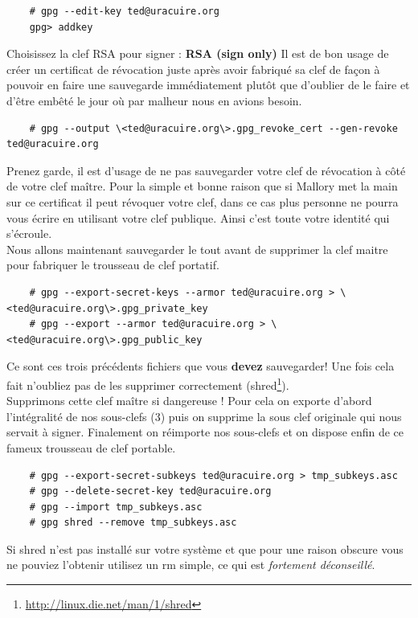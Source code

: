 \documentclass[a4paper]{article}
\begin{document}
\begin{verbatim}
    # gpg --edit-key ted@uracuire.org
    gpg> addkey
\end{verbatim}
Choisissez la clef RSA pour signer : \textbf{RSA (sign only)}
\newpage
Il est de bon usage de créer un certificat de révocation juste après avoir
fabriqué sa clef de façon à pouvoir en faire une sauvegarde immédiatement
plutôt que d'oublier de le faire et d'être embêté le jour où par malheur nous
en avions besoin.

\begin{verbatim}
    # gpg --output \<ted@uracuire.org\>.gpg_revoke_cert --gen-revoke ted@uracuire.org
\end{verbatim}
Prenez garde, il est d'usage de ne pas sauvegarder votre clef de révocation à
côté de votre clef maître. Pour la simple et bonne raison que si Mallory met la
main sur ce certificat il peut révoquer votre clef, dans ce cas plus personne
ne pourra vous écrire en utilisant votre clef publique. Ainsi c'est toute votre
identité qui s'écroule.
\\
Nous allons maintenant sauvegarder le tout avant de supprimer la clef maitre
pour fabriquer le trousseau de clef portatif.

\begin{verbatim}
    # gpg --export-secret-keys --armor ted@uracuire.org > \<ted@uracuire.org\>.gpg_private_key
    # gpg --export --armor ted@uracuire.org > \<ted@uracuire.org\>.gpg_public_key
\end{verbatim}

Ce sont ces trois précédents fichiers que vous \textbf{devez} sauvegarder!
Une fois cela fait n'oubliez pas de les supprimer correctement (shred\protect\footnote{\url{http://linux.die.net/man/1/shred}}).
\\
Supprimons cette clef maître si dangereuse ! Pour cela on exporte d'abord
l'intégralité de nos sous-clefs (3) puis on supprime la sous clef originale qui
nous servait à signer. Finalement on réimporte nos sous-clefs et on dispose
enfin de ce fameux trousseau de clef portable.

\begin{verbatim}
    # gpg --export-secret-subkeys ted@uracuire.org > tmp_subkeys.asc
    # gpg --delete-secret-key ted@uracuire.org
    # gpg --import tmp_subkeys.asc
    # gpg shred --remove tmp_subkeys.asc
\end{verbatim}
Si shred n'est pas installé sur votre système et que pour une raison obscure
vous ne pouviez l'obtenir utilisez un rm simple, ce qui est \emph{fortement
déconseillé}.
\end{document}
